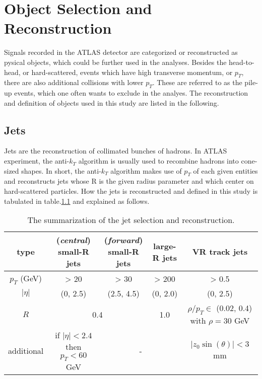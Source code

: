 \documentclass[class=NCU_thesis, crop=false]{standalone}
\begin{document}
\chapter{Object Selection and Reconstruction}
	Signals recorded in the ATLAS detector are categorized or reconstructed as pysical objects, which could be further used in the analyses. Besides the head-to-head, or hard-scattered, events which have high transverse momentum, or $p_T$, there are also additional collisions with lower $p_T$. These are referred to as the pile-up events, which one often wants to exclude in the analyes. The reconstruction and definition of objects used in this study are listed in the following.
	
\section{Jets}
	Jets are the reconstruction of collimated bunches of hadrons. In ATLAS experiment, the anti-$k_T$ algorithm is usually used to recombine hadrons into cone-sized shapes. In short, the anti-$k_T$ algorithm makes use of $p_T$ of each given entities and reconstructs jets whose R is the given radius parameter and which center on hard-scattered particles. How the jets is reconstructed and defined in this study is tabulated in table.\ref{tab:jet selection} and explained as follows.
	
	\begin{table}[h]
		\centering
		\caption{The summarization of the jet selection and reconstruction.}
		\label{tab:jet selection}
		\begin{tabular}{|c|c|c|c|c|}
			\hline
			type & \shortstack{(\textit{central})\\small-R jets} & \shortstack{(\textit{forward})\\small-R jets} & large-R jets & VR track jets \\ \hline
			$p_T$ (GeV) & > 20 & > 30 & > 200 & > 0.5 \\ \hline
			$\lvert \eta \rvert$ & (0, 2.5) & (2.5, 4.5) & (0, 2.0) & (0, 2.5) \\ \hline
			$R$ & \multicolumn{2}{c|}{0.4} & 1.0 & \shortstack{$\rho / p_T \in$ (0.02, 0.4)\\ with $\rho = 30$ GeV} \\ \hline
			additional & \shortstack{if $\lvert \eta \rvert < 2.4$ then\\$p_T < 60$ GeV} & \multicolumn{2}{c|}{-} & $\lvert z_0 \sin(\theta) \rvert < 3$ mm \\ \hline
		\end{tabular}
	\end{table}
	
\end{document}
